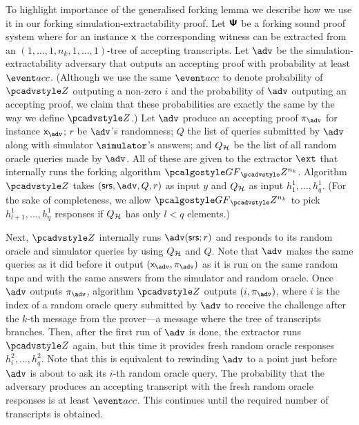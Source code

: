 To highlight importance of the generalised forking lemma we describe how we use
it in our forking simulation-extractability proof.  Let $\bm{\mathsf{\Psi}}$ be a
forking sound proof system where for an instance $\mathsf{x}$ the
corresponding witness can be extracted from an
$(1, \ldots, 1, n_k, 1, \ldots, 1)$-tree of accepting transcripts.  Let $\advse$
be the simulation-extractability adversary that outputs an accepting proof with
probability at least $\accProb$. (Although we use the same $\accProb$ to denote
probability of $\zdv$ outputing a non-zero $i$ and the probability of $\advse$
outputing an accepting proof, we claim that these probabilities are exactly the
same by the way we define $\zdv$.)  Let $\advse$ produce an accepting
proof $\zkproof_{\advse}$ for instance $\inp_{\advse}$; $r$ be $\advse$'s
randomness; $Q$ the list of queries submitted by $\advse$ along with simulator
$\simulator$'s answers;  and $Q_{\mathcal{H}}$ be the list of all random oracle
queries made by $\advse$.  All of these are given to the extractor $\ext$ that
internally runs the forking algorithm $\genforking_\zdv^{n_k}$.  Algorithm $\zdv$
takes $(\srs, \advse,
Q, r)$ as input $y$ and $Q_{\mathcal{H}}$ as input $h_1^1, \ldots,
h_q^1$. 
(For the sake of completeness, we allow $\genforking_\zdv^{n_k}$ to
pick $h^1_{l + 1}, \ldots, h^1_q$ responses if $Q_{\mathcal{H}}$ has only $l < q$
elements.)  

Next, $\zdv$ internally runs $\advse(\srs; r)$  and responds to its random
oracle and simulator queries by using $Q_{\mathcal{H}}$ and $Q$. Note that $\advse$ makes
the same queries as it did before it output $(\inp_{\advse}, \zkproof_{\advse})$
as it is run on the same random tape and with the same answers from the
simulator and random oracle. Once $\advse$ outputs 
$\zkproof_{\advse}$, algorithm $\zdv$ outputs $(i, \zkproof_{\advse})$, where
$i$ is the index of a random oracle query submitted by $\advse$ to receive the challenge after the
$k$-th message from the prover---a message where the tree of transcripts
branches.
Then, after the first run of $\advse$ is done, the extractor runs $\zdv$ again,
but this time it provides fresh random oracle responses $h^2_i, \ldots,
h^2_q$. Note that this is equivalent to rewinding $\advse$ to a point just
before $\advse$ is about to ask its $i$-th random oracle
query. The probability that the adversary produces an accepting transcript with the
fresh random oracle responses is at least $\accProb$. This continues until the
required number of transcripts is obtained. 


